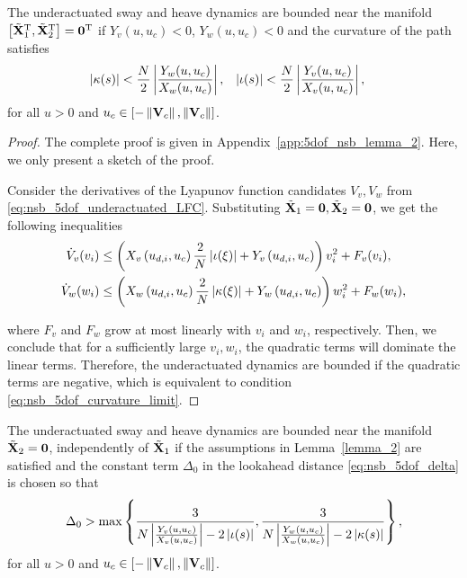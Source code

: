 \begin{lemma}
    \label{lemma_2}
    The underactuated sway and heave dynamics are bounded near the manifold $\left[\tilde{\mathbf{X}}_1^{\mathrm{T}}, \tilde{\mathbf{X}}_2^{\mathrm{T}}\right] = \mathbf{0}^{\mathrm{T}}$ if $Y_v(u, u_c) < 0$, $Y_w(u, u_c) < 0$ and the curvature of the path satisfies
    \begin{align}
        \left|\kappa(s)\right| &< \frac{N}{2}\left|\frac{Y_w(u, u_c)}{X_w(u, u_c)}\right|, &
        \left|\iota(s)\right| &< \frac{N}{2}\left|\frac{Y_v(u, u_c)}{X_v(u, u_c)}\right|, \label{eq:nsb_5dof_curvature_limit}
    \end{align}
    for all $u > 0$ and $u_c \in [-\left\|\mathbf{V}_c\right\|, \left\|\mathbf{V}_c\right\|]$.
\end{lemma}

\begin{proof}
    The complete proof is given in Appendix~\ref{app:5dof_nsb_lemma_2}.
    Here, we only present a sketch of the proof.

    Consider the derivatives of the Lyapunov function candidates $V_v, V_w$ from \eqref{eq:nsb_5dof_underactuated_LFC}.
    Substituting $\tilde{\mathbf{X}}_1 = \mathbf{0}, \tilde{\mathbf{X}}_2 = \mathbf{0}$, we get the following inequalities
    \begin{align} 
            \dot{V}_v(v_i) &\leq \left(X_v\left(u_{d,i}, u_c\right)\frac{2}{N}\left|\iota(\xi)\right| + Y_v\left(u_{d,i}, u_c\right)\right)v_i^2 + F_v(v_i), \\
            \dot{V}_w(w_i) &\leq \left(X_w\left(u_{d,i}, u_c\right)\frac{2}{N}\left|\kappa(\xi)\right| + Y_w\left(u_{d,i}, u_c\right)\right)w_i^2 + F_w(w_i),
    \end{align}

    \noindent where $F_v$ and $F_w$ grow at most linearly with $v_i$ and $w_i$, respectively.
    Then, we conclude that for a sufficiently large $v_i, w_i$, the quadratic terms will dominate the linear terms.
    Therefore, the underactuated dynamics are bounded if the quadratic terms are negative, which is equivalent to condition \eqref{eq:nsb_5dof_curvature_limit}.
\end{proof}

\begin{lemma}
    \label{lemma_3}
    The underactuated sway and heave dynamics are bounded near the manifold $\tilde{\mathbf{X}}_2 = \mathbf{0}$, independently of $\tilde{\mathbf{X}}_1$ if the assumptions in Lemma~\ref{lemma_2} are satisfied and the constant term $\Delta_0$ in the lookahead distance \eqref{eq:nsb_5dof_delta} is chosen so that
    \begin{equation}
        \Delta_0 > \max\left\{\frac{3}{N\left|\frac{Y_v\left(u, u_c\right)}{X_v\left(u, u_c\right)}\right| - 2\left|\iota(s)\right|}, \frac{3}{N\left|\frac{Y_w\left(u, u_c\right)}{X_w\left(u, u_c\right)}\right| - 2\left|\kappa(s)\right|}\right\},
        \label{eq:nsb_5dof_lookahead_limit}
    \end{equation}
    for all $u > 0$ and $u_c \in [-\left\|\mathbf{V}_c\right\|, \left\|\mathbf{V}_c\right\|]$.
\end{lemma}

